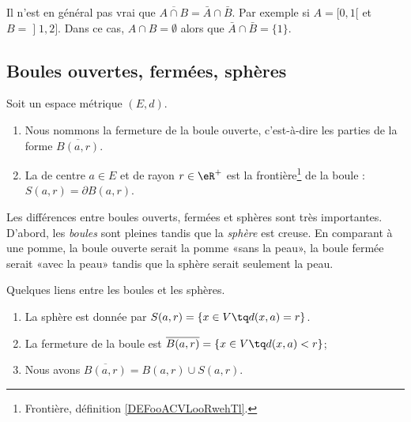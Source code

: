 \begin{example} \label{ExBFLooUNyvbw}
	Il n'est en général pas vrai que \( \overline{ A\cap B }=\bar A\cap \bar B\). Par exemple si \( A=\mathopen[ 0 , 1 [\) et \( B=\mathopen] 1 , 2 \mathclose]\). Dans ce cas, \( A\cap B=\emptyset\) alors que \( \bar A\cap\bar B=\{ 1 \}\).
\end{example}

\subsection{Boules ouvertes, fermées, sphères}

\begin{definition}      \label{DEFooPDSJooFcUqKH}
	Soit un espace métrique \( (E,d)\).
	\begin{enumerate}
		\item
		      Nous nommons  la fermeture de la boule ouverte, c'est-à-dire les parties de la forme \( \overline{ B(a,r) }\).
		\item
		      La  de centre \( a\in E\) et de rayon \( r\in \eR^+\) est la frontière\footnote{Frontière, définition \ref{DEFooACVLooRwehTl}.} de la boule : \( S(a,r)=\partial B(a,r)\).
	\end{enumerate}
\end{definition}

\begin{normaltext}
	Les différences entre boules ouverts, fermées et sphères sont très importantes. D'abord, les \emph{boules} sont pleines tandis que la \emph{sphère} est creuse. En comparant à une pomme, la boule ouverte serait la pomme «sans la peau», la boule fermée serait «avec la peau» tandis que la sphère serait seulement la peau.
\end{normaltext}

\begin{lemma}       \label{LEMooDYYYooHZitMZ}
	Quelques liens entre les boules et les sphères.
	\begin{enumerate}
		\item
		      La sphère est donnée par \( S(a,r)=\{ x\in V\tq d(x,a)=r \}\).
		\item
		      La fermeture de la boule est \( \overline{ B(a,r) }=\{ x\in V\tq d(x,a)<r \}\);
		\item
		      Nous avons \( \overline{ B(a,r) }=B(a,r)\cup S(a,r)\).
	\end{enumerate}
\end{lemma}


